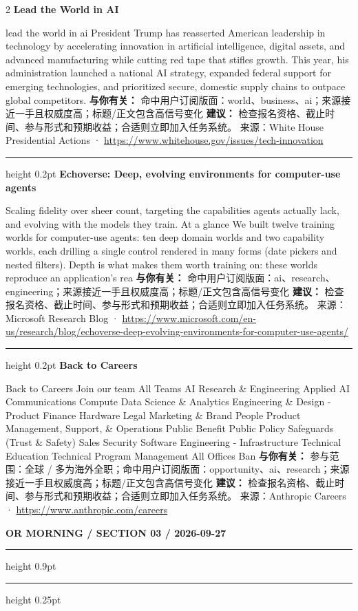 \documentclass[10.5pt]{ctexart}
\begin{document}
\begin{multicols}{2}
{\large\bfseries Lead the World in AI}\par
lead the world in ai President Trump has reasserted American leadership in technology by accelerating innovation in artificial intelligence, digital assets, and advanced manufacturing while cutting red tape that stifles growth. This year, his administration launched a national AI strategy, expanded federal support for emerging technologies, and prioritized secure, domestic supply chains to outpace global competitors.
\textbf{与你有关：} 命中用户订阅版面：world、business、ai；来源接近一手且权威度高；标题/正文包含高信号变化
\textbf{建议：} 检查报名资格、截止时间、参与形式和预期收益；合适则立即加入任务系统。
{\footnotesize\color{ormuted} 来源：White House Presidential Actions · \url{https://www.whitehouse.gov/issues/tech-innovation}}
\vspace{2mm}
\hrule height 0.2pt
\vspace{2mm}
{\large\bfseries Echoverse: Deep, evolving environments for computer-use agents}\par
Scaling fidelity over sheer count, targeting the capabilities agents actually lack, and evolving with the models they train. At a glance We built twelve training worlds for computer-use agents: ten deep domain worlds and two capability worlds, each drilling a single control rendered in many forms (date pickers and nested filters). Depth is what makes them worth training on: these worlds reproduce an application’s rea
\textbf{与你有关：} 命中用户订阅版面：ai、research、engineering；来源接近一手且权威度高；标题/正文包含高信号变化
\textbf{建议：} 检查报名资格、截止时间、参与形式和预期收益；合适则立即加入任务系统。
{\footnotesize\color{ormuted} 来源：Microsoft Research Blog · \url{https://www.microsoft.com/en-us/research/blog/echoverse-deep-evolving-environments-for-computer-use-agents/}}
\vspace{2mm}
\hrule height 0.2pt
\vspace{2mm}
{\large\bfseries Back to Careers}\par
Back to Careers Join our team All Teams AI Research \& Engineering Applied AI Communications Compute Data Science \& Analytics Engineering \& Design - Product Finance Hardware Legal Marketing \& Brand People Product Management, Support, \& Operations Public Benefit Public Policy Safeguards (Trust \& Safety) Sales Security Software Engineering - Infrastructure Technical Education Technical Program Management All Offices Ban
\textbf{与你有关：} 参与范围：全球 / 多为海外全职；命中用户订阅版面：opportunity、ai、research；来源接近一手且权威度高；标题/正文包含高信号变化
\textbf{建议：} 检查报名资格、截止时间、参与形式和预期收益；合适则立即加入任务系统。
{\footnotesize\color{ormuted} 来源：Anthropic Careers · \url{https://www.anthropic.com/careers}}
\end{multicols}
\newpage
{\small\bfseries OR MORNING / SECTION 03 / 2026-09-27}
\vspace{2mm}
\hrule height 0.9pt
\vspace{1.5mm}
\hrule height 0.25pt
\vspace{4mm}
\end{document}
